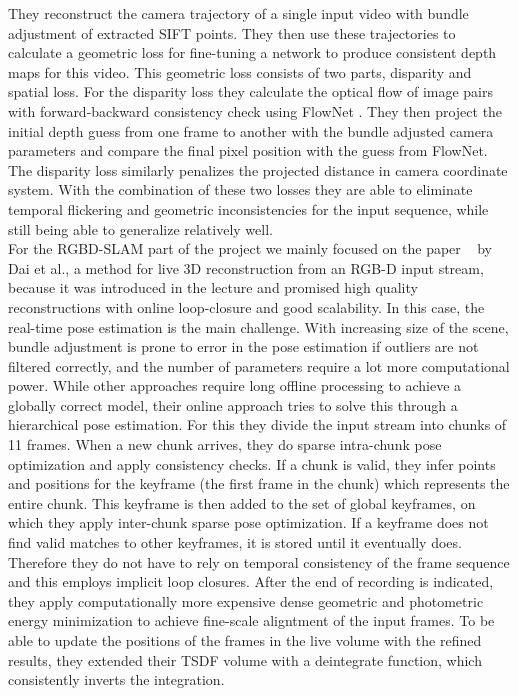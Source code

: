     They reconstruct the camera trajectory of a single input video with bundle adjustment of extracted SIFT points.
    They then use these trajectories to calculate a geometric loss for fine-tuning a network to produce consistent depth maps for this video.
    This geometric loss consists of two parts, disparity and spatial loss.
    For the disparity loss they calculate the optical flow of image pairs with forward-backward consistency check using FlowNet \cite{DFIB15}.
    They then project the initial depth guess from one frame to another with the bundle adjusted camera parameters and compare the final pixel position with the guess from FlowNet.
    The disparity loss similarly penalizes the projected distance in camera coordinate system.
    With the combination of these two losses they are able to eliminate temporal flickering and geometric inconsistencies for the input sequence, while still being able to generalize relatively well.\\
    \newpage
    \noindent For the RGBD-SLAM part of the project we mainly focused on the paper ~\cite{dai2017bundlefusion} by Dai et al., a method for live 3D reconstruction from an RGB-D input stream, because it was introduced in the lecture and promised high quality reconstructions with online loop-closure and good scalability.
    In this case, the real-time pose estimation is the main challenge.
    With increasing size of the scene, bundle adjustment is prone to error in the pose estimation if outliers are not filtered correctly, and the number of parameters require a lot more computational power.
    While other approaches require long offline processing to achieve a globally correct model, their online approach tries to solve this through a hierarchical pose estimation.
    For this they divide the input stream into chunks of 11 frames.
    When a new chunk arrives, they do sparse intra-chunk pose optimization and apply consistency checks.
    If a chunk is valid, they infer points and positions for the keyframe (the first frame in the chunk) which represents the entire chunk.
    This keyframe is then added to the set of global keyframes, on which they apply inter-chunk sparse pose optimization.
    If a keyframe does not find valid matches to other keyframes, it is stored until it eventually does.
    Therefore they do not have to rely on temporal consistency of the frame sequence and this employs implicit loop closures.
    After the end of recording is indicated, they apply computationally more expensive dense geometric and photometric energy minimization to achieve fine-scale aligntment of the input frames.
    To be able to update the positions of the frames in the live volume with the refined results, they extended their TSDF volume with a deintegrate function, which consistently inverts the integration.